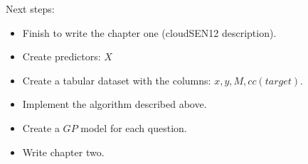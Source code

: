\documentclass{beamer}
\begin{document}
\begin{frame}[fragile]{Next steps:}
	\begin{itemize}
		\item Finish to write the chapter one (cloudSEN12 description).
		\item Create predictors: $X$
		\item Create a tabular dataset with the columns: $x, y, M, cc (target)$.
		\item Implement the algorithm described above.
		\item Create a $GP$ model for each question.
		\item Write chapter two.
	\end{itemize}
\end{frame}
\end{document}
